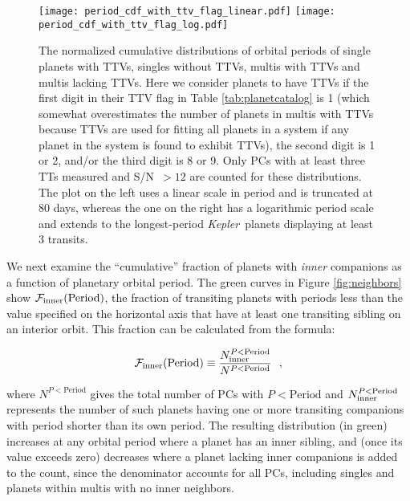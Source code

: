 \documentclass{aastex62}
\newcommand{\ik}{{\it Kepler~}}
\begin{document}
\begin{figure}
\centering
\texttt{[image: period\_cdf\_with\_ttv\_flag\_linear.pdf]}
\texttt{[image: period\_cdf\_with\_ttv\_flag\_log.pdf]}
\caption{The normalized cumulative distributions of orbital periods of single planets with TTVs, singles without TTVs, multis with TTVs and multis lacking TTVs.  Here we consider planets to have TTVs if the first digit in their TTV flag in Table \ref{tab:planetcatalog} is 1 (which somewhat overestimates the number of planets in multis with TTVs because TTVs are used for fitting all planets in a system if any planet in the system is found to exhibit TTVs), the second digit is 1 or 2, and/or the third digit is 8 or 9.  Only PCs with at least three TTs measured and S/N~$> 12$ are counted for these distributions. The plot on the left uses a linear scale in period and is truncated at 80 days, whereas the one on the right has a logarithmic period scale and extends to the longest-period \ik planets displaying at least 3 transits. }%
\label{fig:period_TTVs}
\end{figure}

We next examine the ``cumulative'' fraction of planets with \emph{inner} companions as a function of planetary orbital period.  The green curves in Figure \ref{fig:neighbors} show ${\cal F}_{\rm inner}(\textrm{Period})$, the fraction of transiting planets with periods less than the value specified on the horizontal axis that have at least one transiting sibling on an interior orbit. This fraction can be calculated from the formula:

\begin{equation}
{\cal F}_{\rm inner}(\textrm{Period}) \equiv \dfrac{N_{\rm inner}^{P<\textrm{Period}}}{N^{P<\textrm{Period}}} ~~,
\label{eqn:innercompanionfraction}
\end{equation}

\noindent where $N^{P<\textrm{Period}}$ gives the total number of PCs with $P < \textrm{Period}$ and $N_{\rm inner}^{P<\textrm{Period}}$ represents the number of such planets having one or more transiting companions with period shorter than its own period.  The resulting distribution (in green) increases at any orbital period where a planet has an inner sibling, and (once its value exceeds zero) decreases where a planet lacking inner companions is added to the count, since the denominator accounts for all PCs, including singles and planets within multis with no inner neighbors. 
\end{document}
